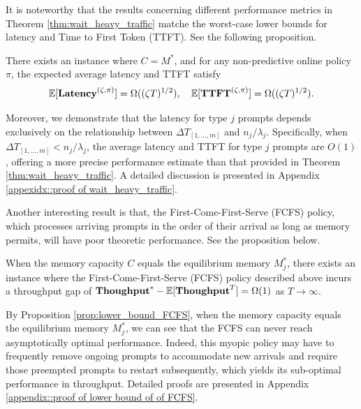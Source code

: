 It is noteworthy that the results concerning different performance metrics in Theorem \ref{thm:wait_heavy_traffic} matche the worst-case lower bounds for latency and Time to First Token (TTFT). See the following proposition.
\begin{proposition}\label{prop::simple random walk, tight bound}
There exists an instance where \( C = M^* \), and for any non-predictive online policy \(\pi\), the expected average latency and TTFT satisfy
\[
\mathbb{E}[\textbf{Latency}^{(\zeta,\pi)}] = \Omega((\zeta T)^{1/2}), \quad \mathbb{E}[\textbf{TTFT}^{(\zeta,\pi)}] = \Omega((\zeta T)^{1/2}).
\]
\end{proposition}

Moreover, we demonstrate that the latency for type \( j \) prompts depends exclusively on the relationship between \(\Delta T_{[1,\dots,m]}\) and $n_j/\lambda_j$. Specifically, when \(\Delta T_{[1,\dots,m]} < n_j/\lambda_j\), the average latency and TTFT for type \( j \) prompts are \( O(1) \), offering a more precise performance estimate than that provided in Theorem \ref{thm:wait_heavy_traffic}. A detailed discussion is presented in Appendix \ref{appexidx::proof of wait_heavy_traffic}.

Another interesting result is that, the First-Come-First-Serve (FCFS) policy, which processes arriving prompts in the order of their arrival as long as memory permits, will have poor theoretic performance. See the proposition below.
\begin{proposition}\label{prop:lower_bound_FCFS}
When the memory capacity \(C\) equals the equilibrium memory \(M_j^*\), there exists an instance where the First-Come-First-Serve (FCFS) policy described above incurs a throughput gap of \(\textbf{Thoughput}^* - \mathbb{E}[\textbf{Thoughput}^T] = \Omega(1)\) as \(T \to \infty\).
\end{proposition}
By Proposition \ref{prop:lower_bound_FCFS}, when the memory capacity equals the equilibrium memory \(M_j^*\), we can see that the FCFS can never reach asymptotically optimal performance. Indeed, this myopic policy may have to frequently remove ongoing prompts to accommodate new arrivals and require those preempted prompts to restart subsequently, which yields its sub-optimal performance in throughput. Detailed proofs are presented in Appendix \ref{appendix::proof of lower bound of of FCFS}.


